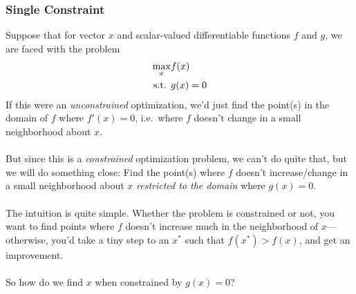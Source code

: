 \documentclass[12pt]{article}
\numberwithin{equation}{section} %
\theoremstyle{plain}
\theoremstyle{definition}
\theoremstyle{remark}
\begin{document}
\subsubsection{Single Constraint}
Suppose that for vector $x$ and scalar-valued differentiable functions
$f$ and $g$, we are faced with the problem
\begin{align}
  \max_x &f(x) \label{prob:eqconst}\\
  \text{s.t. } &g(x) = 0 \notag
\end{align}
If this were an \emph{unconstrained} optimization, we'd just find the
point(s) in the domain of $f$ where $f'(x)=0$, i.e.\ where $f$ doesn't
change in a small neighborhood about $x$.
\\
\\
But since this is a \emph{constrained} optimization problem, we can't do
quite that, but we will do something close: Find the point(s) where $f$
doesn't increase/change in a small neighborhood about $x$
\emph{restricted to the domain} where $g(x)=0$.
\\
\\
The intuition is quite simple. Whether the problem is constrained or
not, you want to find points where $f$ doesn't increase much in the
neighborhood of $x$---otherwise, you'd take a tiny step to an $x^*$ such
that $f(x^*) > f(x)$, and get an improvement.
\\
\\
So how do we find $x$ when constrained by $g(x)=0$?
\end{document}
